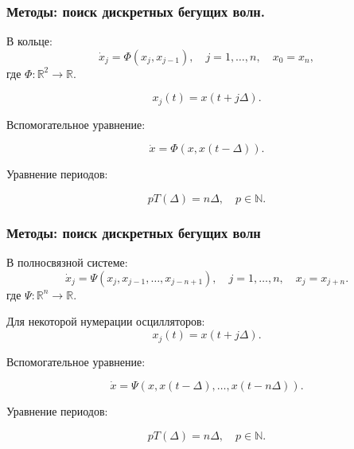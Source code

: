 \begin{frame}
	\frametitle{Методы: поиск дискретных бегущих волн.}
	
	В кольце:
	\begin{equation*}
		\dot{x}_j=\Phi(x_j, x_{j-1}), \quad j=1, \ldots, n, \quad x_{0} = x_{n},
	\end{equation*}
	где $\Phi:\mathbb{R}^2\to\mathbb{R}$. 
	
	\begin{equation*}
		x_j(t) = x(t + j\Delta).
	\end{equation*}
	
	\pause
	
	Вспомогательное уравнение:
	
	\begin{equation}
		\label{eq:intro:Phi_circ}
		\dot{x}=\Phi(x, x(t-\Delta)).
	\end{equation}
	
	Уравнение периодов:
	
	\begin{equation}
	\label{eq_period_Delta}
	p T(\Delta) = n\Delta, \quad p \in \mathbb{N}.
	\end{equation}
\end{frame}

\begin{frame}
	\frametitle{Методы: поиск дискретных бегущих волн}
	
	В полносвязной системе:
	\begin{equation*}
		\dot{x}_j= \Psi(x_j, x_{j-1}, \ldots, x_{j-n+1}), \quad j=1, \ldots, n, \quad x_j = x_{j+n}.
	\end{equation*}
	где $\Psi:\mathbb{R}^{n}\to\mathbb{R}$.
	
	Для некоторой нумерации осцилляторов:
	\begin{equation*}
		x_j(t) = x(t + j\Delta).
	\end{equation*}
	
	Вспомогательное уравнение:
	
	\begin{equation}
		\dot{x}= \Psi(x, x(t-\Delta), \ldots, x(t-n\Delta)).
	\end{equation}
	
	Уравнение периодов:
	
	\begin{equation}
		p T(\Delta) = n\Delta, \quad p \in \mathbb{N}.
	\end{equation}
\end{frame}

